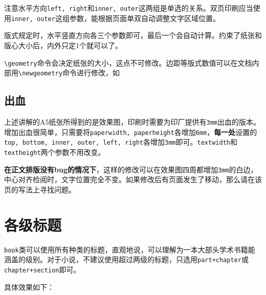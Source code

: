 \documentclass[10pt,openany]{book}
\begin{document}
注意水平方向\texttt{left,\ right}和\texttt{inner,\ outer}这两组是单选的关系。双页印刷应当使用\texttt{inner,\ outer}这组参数，能根据页面单双自动调整文字区域位置。



版式规定时，水平竖直方向各三个参数即可，最后一个会自动计算。约束了纸张和版心大小后，内外只定1个就可以了。

\texttt{\textbackslash{}geometry}命令会决定纸张的大小，这点不可修改。边距等版式数值可以在文档内部用\texttt{\textbackslash{}newgeometry}命令进行修改，如



\subsection{出血}

上述讲解的A5纸张所得到的是效果图，印刷时需要为印厂提供有\texttt{3mm}出血的版本。增加出血很简单，只需要将\texttt{paperwidth,\ paperheight}各增加\texttt{6mm}，\textbf{每一处}设置的\texttt{top,\ bottom,\ inner,\ outer,\ left,\ right}各增加\texttt{3mm}即可。\texttt{textwidth}和\texttt{textheight}两个参数不用改变。

\textbf{在正文排版没有bug的情况下}，这样的修改可以在效果图四周都增加\texttt{3mm}的白边，中心对齐检阅时，文字位置完全不变。如果修改后有页面发生了移动，那么请在该页的写法上寻找问题。

\section{各级标题}
\label{title}

\texttt{book}类可以使用所有种类的标题，直观地说，可以理解为一本大部头学术书籍能涵盖的级别。对于小说，不建议使用超过两级的标题，只选用\texttt{part+chapter}或\texttt{chapter+section}即可。

具体效果如下：
\end{document}
